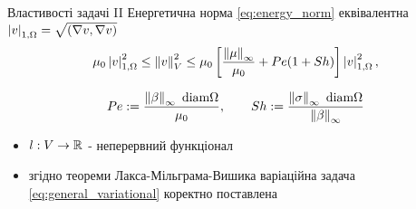 \begin{frame}{Властивості задачі II}
	Енергетична норма \eqref{eq:energy_norm} еквівалентна $\left|v\right|_{1,\Omega} = \sqrt{(\nabla v, \nabla v)}$ 
 	\begin{equation}\label{eq:norm_equivalence}
		\mu_0 \left|v\right|_{1,\Omega}^2 \le \left\lVert v\right\rVert^2_V \le
			\mu_0
				\left[
					\frac{\left\lVert\mu\right\rVert_\infty}{\mu_0}+Pe(1+Sh)
				\right]
			\left|v\right|_{1,\Omega}^2 ,
	\end{equation}

	\begin{equation}
		Pe:= \frac{\left\lVert\beta\right\rVert_\infty \text{ diam} \Omega}{\mu_0}, \qquad
		Sh:= \frac{\left\lVert\sigma\right\rVert_\infty \text{ diam} \Omega}{\left\lVert\beta\right\rVert_\infty}
	\end{equation}

	\begin{itemize}
		\item $l : V \to \mathbb{R}$ - неперервний функціонал
		\item згідно теореми Лакса-Мільграма-Вишика варіаційна задача \eqref{eq:general_variational} коректно поставлена
	\end{itemize}

\end{frame}

\undeff{\vonenorm}
